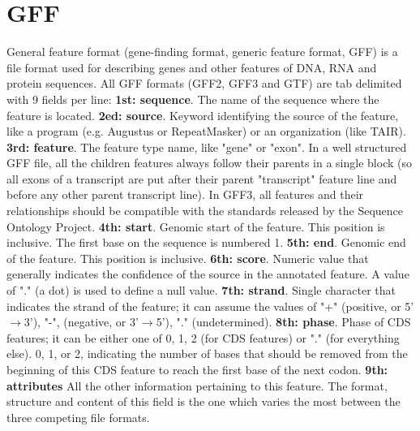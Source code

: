\documentclass[11pt]{article}
\begin{document}
\begin{sloppypar}
\section{GFF}
General feature format (gene-finding format, generic feature format, GFF) is a file format used for describing genes and other features of DNA, RNA and protein sequences. 
All GFF formats (GFF2, GFF3 and GTF) are tab delimited with 9 fields per line: 
\newline
\textbf{1st: sequence}. 
The name of the sequence where the feature is located.
\newline
\textbf{2ed: source}. 
Keyword identifying the source of the feature, like a program (e.g. Augustus or RepeatMasker) or an organization (like TAIR).
\newline
\textbf{3rd: feature}. 
The feature type name, like "gene" or "exon". 
In a well structured GFF file, all the children features always follow their parents in a single block (so all exons of a transcript are put after their parent "transcript" feature line and before any other parent transcript line). 
In GFF3, all features and their relationships should be compatible with the standards released by the Sequence Ontology Project.
\newline
\textbf{4th: start}. 
Genomic start of the feature. 
This position is inclusive. 
The first base on the sequence is numbered 1.
\newline
\textbf{5th: end}. 
Genomic end of the feature. 
This position is inclusive.
\newline
\textbf{6th: score}. 
Numeric value that generally indicates the confidence of the source in the annotated feature. 
A value of "." (a dot) is used to define a null value.
\newline
\textbf{7th: strand}. 
Single character that indicates the strand of the feature; 
it can assume the values of "+" (positive, or 5'$\rightarrow$3'), "-", (negative, or 3'$\rightarrow$5'), "." (undetermined).
\newline
\textbf{8th: phase}. 
Phase of CDS features; it can be either one of 0, 1, 2 (for CDS features) or "." (for everything else). 
0, 1, or 2, indicating the number of bases that should be removed from the beginning of this CDS feature to reach the first base of the next codon.
\newline
\textbf{9th: attributes} 
All the other information pertaining to this feature. 
The format, structure and content of this field is the one which varies the most between the three competing file formats.


\end{sloppypar}
\end{document}
